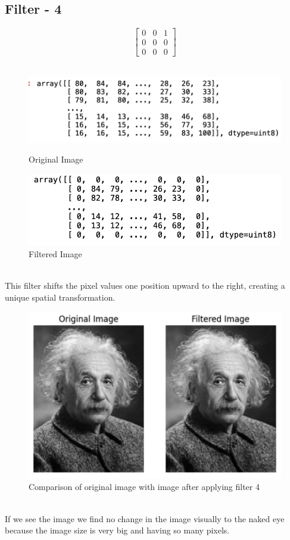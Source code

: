 \documentclass{assignment}
\begin{document}
\subsection{Filter - 4}
\[
\begin{bmatrix} 0 & 0 & 1 \\ 0 & 0 & 0 \\ 0 & 0 & 0 \end{bmatrix}
\]
\\
\begin{figure}[h]
  \begin{minipage}{0.5\textwidth}
    \centering
    \includegraphics[width=0.8\linewidth]{image.png}
    \caption{Original Image}
    \label{fig:original_image}
  \end{minipage}%
  \begin{minipage}{0.5\textwidth}
    \centering
    \includegraphics[width=0.8\linewidth]{f4.png}
    \caption{Filtered Image}
    \label{fig:filtered_image}
  \end{minipage}
\end{figure}
\\
This filter shifts the pixel values one position upward to the right, creating a unique spatial transformation.
\begin{figure}[h]
    \centering
    \includegraphics[width=0.5\linewidth]{magic.png}
    \caption{Comparison of original image with image after applying filter 4}
    \label{fig:enter-label}
\end{figure}
\\
If we see the image we  find no change in the image visually to the naked eye because the image size is very big and having so many pixels.
\end{document}
